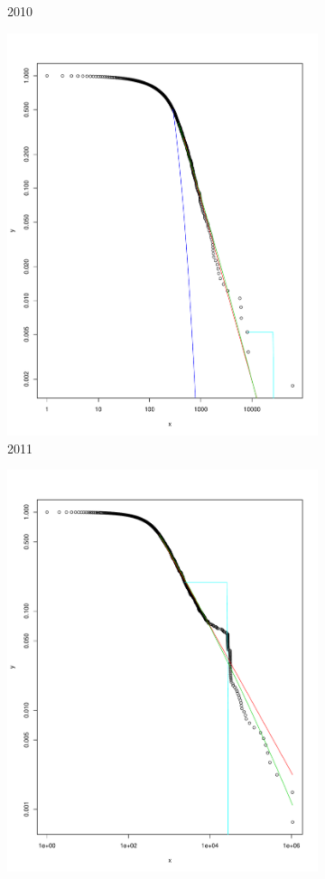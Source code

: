 \documentclass[preprint,12pt]{elsarticle}
\begin{document}
\begin{figure}[H]
\begin{subfigure}{.3\textwidth}
  \caption{2010}
  \label{fig:2010in}
\end{subfigure}
\begin{subfigure}{.3\textwidth}
  \centering
  \includegraphics[width=.8\linewidth]{Bitcoin-graphs/deg-dist-2011-in.pdf}  
  \caption{2011}
  \label{fig:2011in}
\end{subfigure}
\begin{subfigure}{.3\textwidth}
  \centering
  \includegraphics[width=.8\linewidth]{Bitcoin-graphs/deg-dist-2012-in.pdf}  

\end{subfigure}
\end{figure}
\end{document}
